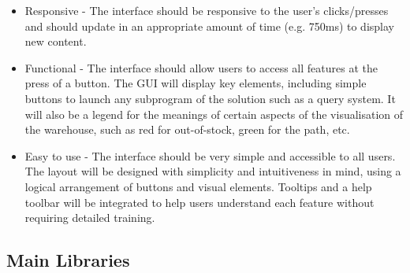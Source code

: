 \begin{itemize}
    \item Responsive - The interface should be responsive to the user's clicks/presses and should update in an appropriate amount of time (e.g. 750ms) to display new content.

    \item Functional - The interface should allow users to access all features at the press of a button. The GUI will display key elements, including simple buttons to launch any subprogram of the solution such as a query system. It will also be a legend for the meanings of certain aspects of the visualisation of the warehouse, such as red for out-of-stock, green for the path, etc.

    \item Easy to use - The interface should be very simple and accessible to all users. The layout will be designed with simplicity and intuitiveness in mind, using a logical arrangement of buttons and visual elements. Tooltips and a help toolbar will be integrated to help users understand each feature without requiring detailed training.


\end{itemize}

\newpage

\subsection{Main Libraries}

